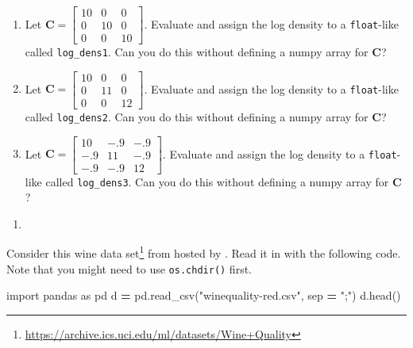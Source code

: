 \documentclass[12pt,krantz2]{krantz}
\makeatletter
\newenvironment{Shaded}{\begin{snugshade}}{\end{snugshade}}
\newcommand{\ImportTok}[1]{#1}
\newcommand{\NormalTok}[1]{#1}
\newcommand{\OperatorTok}[1]{\textcolor[rgb]{0.43,0.43,0.43}{\textbf{#1}}}
\newcommand{\StringTok}[1]{\textcolor[rgb]{0.5,0.5,0.5}{#1}}
\renewcommand{\href}[2]{#2\footnote{\url{#1}}}
\newenvironment{kframe}{%
\medskip{}
\setlength{\fboxsep}{.8em}
 \def\at@end@of@kframe{}%
 \ifinner\ifhmode%
  \def\at@end@of@kframe{\end{minipage}}%
  \begin{minipage}{\columnwidth}%
 \fi\fi%
 \def\FrameCommand##1{\hskip\@totalleftmargin \hskip-\fboxsep
 \colorbox{shadecolor}{##1}\hskip-\fboxsep
     \hskip-\linewidth \hskip-\@totalleftmargin \hskip\columnwidth}%
 \MakeFramed {\advance\hsize-\width
   \@totalleftmargin\z@ \linewidth\hsize
   \@setminipage}}%
 {\par\unskip\endMakeFramed%
 \at@end@of@kframe}
\renewenvironment{Shaded}{\begin{kframe}}{\end{kframe}}
\makeatother
\begin{document}
\begin{enumerate}
\def\labelenumi{\alph{enumi})}
\item
  Let \(\mathbf{C} = \begin{bmatrix} 10 & 0 & 0 \\ 0 & 10 & 0 \\ 0 & 0 & 10 \end{bmatrix}\). Evaluate and assign the log density to a \texttt{float}-like called \texttt{log\_dens1}. Can you do this without defining a numpy array for \(\mathbf{C}\)?
\item
  Let \(\mathbf{C} = \begin{bmatrix} 10 & 0 & 0 \\ 0 & 11 & 0 \\ 0 & 0 & 12 \end{bmatrix}\). Evaluate and assign the log density to a \texttt{float}-like called \texttt{log\_dens2}. Can you do this without defining a numpy array for \(\mathbf{C}\)?
\item
  Let \(\mathbf{C} = \begin{bmatrix} 10 & -.9 & -.9 \\ -.9 & 11 & -.9 \\ -.9 & -.9 & 12 \end{bmatrix}\). Evaluate and assign the log density to a \texttt{float}-like called \texttt{log\_dens3}. Can you do this without defining a numpy array for \(\mathbf{C}\)?
\end{enumerate}

\begin{enumerate}
\def\labelenumi{\arabic{enumi}.}
\setcounter{enumi}{1}
\item
\end{enumerate}

Consider this \href{https://archive.ics.uci.edu/ml/datasets/Wine+Quality}{wine data set} from \citep{wine_data} hosted by \citep{uci_data}. Read it in with the following code. Note that you might need to use \texttt{os.chdir()} first.

\begin{Shaded}
\begin{Highlighting}[]
\ImportTok{import}\NormalTok{ pandas }\ImportTok{as}\NormalTok{ pd}
\NormalTok{d }\OperatorTok{=}\NormalTok{ pd.read_csv(}\StringTok{"winequality-red.csv"}\NormalTok{, sep }\OperatorTok{=} \StringTok{";"}\NormalTok{)}
\NormalTok{d.head()}
\end{Highlighting}
\end{Shaded}
\end{document}
